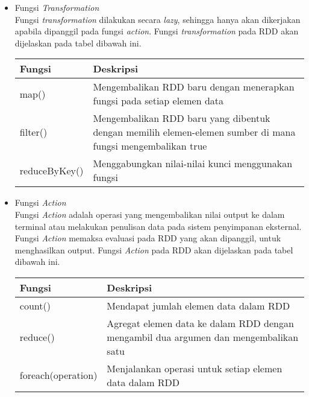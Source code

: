 \begin{itemize}
\item Fungsi \textit{Transformation}\\
Fungsi \textit{transformation} dilakukan secara \textit{lazy}, sehingga hanya akan dikerjakan apabila dipanggil pada fungsi \textit{action}. Fungsi \textit{transformation} pada RDD akan dijelaskan pada tabel dibawah ini.\\

\begin{tabular}{|l|p{10cm}|}
\hline 
\rule[-1ex]{0pt}{2.5ex} Fungsi & Deskripsi \\ 
\hline 
\rule[-1ex]{0pt}{2.5ex} map() & Mengembalikan RDD baru dengan menerapkan fungsi pada setiap elemen data \\ 
\hline 
\rule[-1ex]{0pt}{2.5ex} filter() & Mengembalikan RDD baru yang dibentuk dengan memilih elemen-elemen sumber di mana fungsi mengembalikan true \\ 
\hline 
\rule[-1ex]{0pt}{2.5ex} reduceByKey() & Menggabungkan nilai-nilai kunci menggunakan fungsi \\ 
\hline 
\end{tabular} 

\vspace{0.2cm}

\item Fungsi \textit{Action}\\
Fungsi \textit{Action} adalah operasi yang mengembalikan nilai output ke dalam terminal atau melakukan penulisan data pada sistem penyimpanan eksternal. Fungsi \textit{Action} memaksa evaluasi pada RDD yang akan dipanggil, untuk menghasilkan output. Fungsi \textit{Action} pada RDD akan dijelaskan pada tabel dibawah ini.\\

\begin{tabular}{|l|p{10cm}|}
\hline 
\rule[-1ex]{0pt}{2.5ex} Fungsi & Deskripsi \\ 
\hline 
\rule[-1ex]{0pt}{2.5ex} count() & Mendapat jumlah elemen data dalam RDD \\ 
\hline 
\rule[-1ex]{0pt}{2.5ex} reduce() & Agregat elemen data ke dalam RDD dengan mengambil dua argumen dan mengembalikan satu \\ 
\hline 
\rule[-1ex]{0pt}{2.5ex} foreach(operation) & Menjalankan operasi untuk setiap elemen data dalam RDD \\ 
\hline 
\end{tabular} 
\end{itemize}

